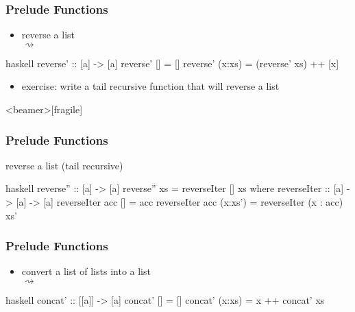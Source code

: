 \documentclass[dvipsnames]{beamer}
\theoremstyle{plain}
\begin{document}
\begin{frame}[fragile]
  \frametitle{Prelude Functions}

  \begin{itemize}
    \item reverse a list\\
       $\rightsquigarrow$
  \end{itemize}

  \begin{exampleblock}{}
    \begin{pygments}{haskell}
reverse' :: [a] -> [a]
reverse' [] = []
reverse' (x:xs) = (reverse' xs) ++ [x]
    \end{pygments}
  \end{exampleblock}

  \pause
  \begin{itemize}
    \item exercise: write a tail recursive function that will reverse a list
  \end{itemize}
\end{frame}

\begin{frame}<beamer>[fragile]
  \frametitle{Prelude Functions}

  \begin{exampleblock}{reverse a list (tail recursive)}
    \begin{pygments}{haskell}
reverse'' :: [a] -> [a]
reverse'' xs = reverseIter [] xs
  where
    reverseIter :: [a] -> [a] -> [a]
    reverseIter acc [] = acc
    reverseIter acc (x:xs') = reverseIter (x : acc) xs'
    \end{pygments}
  \end{exampleblock}
\end{frame}

\begin{frame}[fragile]
  \frametitle{Prelude Functions}

  \begin{itemize}
    \item convert a list of lists into a list\\
      \pygment{haskell}{concat [[2, 3], [], [4]} $\rightsquigarrow$
  \end{itemize}

  \begin{exampleblock}{}
    \begin{pygments}{haskell}
concat' :: [[a]] -> [a]
concat' [] = []
concat' (x:xs) = x ++ concat' xs
    \end{pygments}
  \end{exampleblock}
\end{frame}
\end{document}
